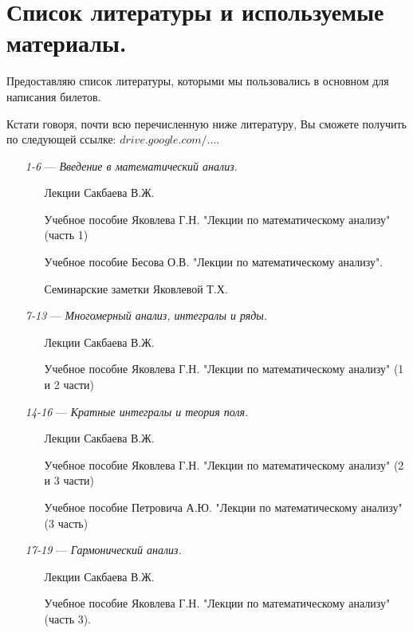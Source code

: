 \chapter{Список литературы и используемые материалы.}

Предоставляю список литературы, которыми мы пользовались в основном для написания билетов. 

Кстати говоря, почти всю перечисленную ниже литературу, Вы сможете получить по следующей ссылке: \href{https://drive.google.com/drive/u/0/folders/0BzuzEyNkpwYDcENXcV9jNWdwVlU}{$drive.google.com/...$}.

\begin{itemize}
\item[\textit{1-6}]
\; --- \: \textit{Введение в математический анализ.} 
\begin{itemize}
\item[\textbullet]
Лекции Сакбаева В.Ж.
\item[\textbullet]
Учебное пособие Яковлева Г.Н. "Лекции по математическому анализу" (часть 1)
\item[\textbullet]
Учебное пособие Бесова О.В. "Лекции по математическому анализу".
\item[\textbullet]
Семинарские заметки Яковлевой Т.Х.
\end{itemize}

\item[\textit{7-13}] 
\; --- \: \textit{Многомерный анализ, интегралы и ряды.}
\begin{itemize}
\item[\textbullet]
Лекции Сакбаева В.Ж.
\item[\textbullet]
Учебное пособие Яковлева Г.Н. "Лекции по математическому анализу" (1 и 2 части)
\end{itemize}

\item[\textit{14-16}] 
\; --- \: \textit{Кратные интегралы и теория поля.}
\begin{itemize}
\item[\textbullet]
Лекции Сакбаева В.Ж.
\item[\textbullet]
Учебное пособие Яковлева Г.Н. "Лекции по математическому анализу" (2 и 3 части)
\item[\textbullet]
Учебное пособие Петровича А.Ю. "Лекции по математическому анализу" (3 часть)
\end{itemize}

\item[\textit{17-19}] 
\; --- \: \textit{Гармонический анализ.}
\begin{itemize}
\item[\textbullet]
Лекции Сакбаева В.Ж.
\item[\textbullet]
Учебное пособие Яковлева Г.Н. "Лекции по математическому анализу"  (часть 3).
\end{itemize}


\end{itemize}
